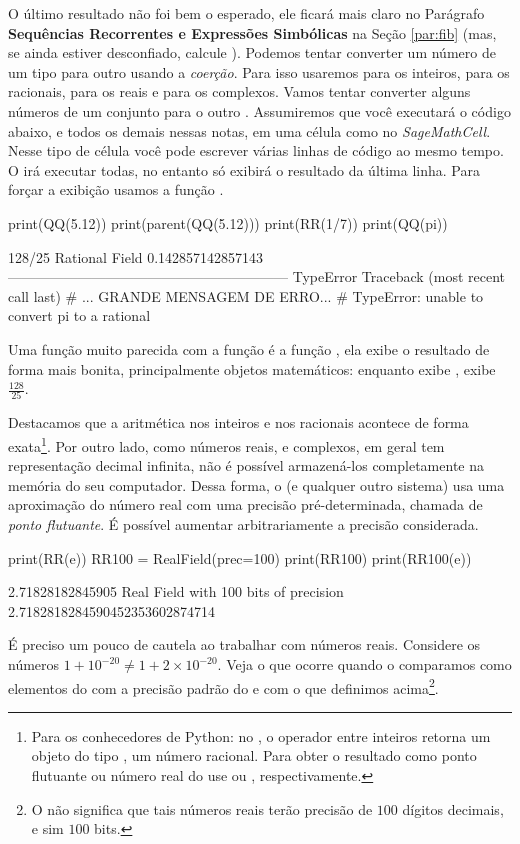 O último resultado não foi bem o esperado, ele ficará
mais claro no Parágrafo \textbf{Sequências Recorrentes
e Expressões Simbólicas} na Seção \ref{par:fib} (mas, se ainda
estiver desconfiado, calcule ). Podemos 
tentar converter um número de um tipo para outro usando
a \emph{coerção}. Para isso usaremos  para os inteiros,  para
os racionais,  para os reais e  para os complexos. 
Vamos tentar converter alguns números de um conjunto para o outro
. Assumiremos que você executará o código abaixo, e todos os demais nessas notas,
em uma célula como no \emph{SageMathCell}. Nesse tipo de célula você
pode escrever várias linhas de código ao mesmo tempo. O \sage
irá executar todas, no entanto só exibirá o resultado
da última linha. Para forçar a exibição usamos a função .
\begin{sageinput}
print(QQ(5.12))
print(parent(QQ(5.12)))
print(RR(1/7))
print(QQ(pi))
\end{sageinput}
\begin{sageoutput}
128/25
Rational Field
0.142857142857143
------------------------------------------------------------
TypeError                  Traceback (most recent call last)
# ...  GRANDE MENSAGEM DE ERRO... #
TypeError: unable to convert pi to a rational
\end{sageoutput}

Uma função muito parecida com a função 
é a função , ela exibe o resultado
de forma mais bonita, principalmente objetos matemáticos:
enquanto  exibe ,
 exibe $\frac{128}{25}$.

Destacamos que a aritmética nos inteiros e nos racionais
acontece de forma exata\footnote{Para os conhecedores
de Python: no \sage, o operador \ils{/} entre inteiros 
retorna um objeto  do tipo , um número
racional. Para obter o resultado como ponto flutuante
ou número real do \sage use   ou 
, respectivamente.}.
 Por outro lado, como números
reais, e complexos, em geral tem representação decimal 
infinita, não é possível armazená-los completamente na
memória do seu computador. Dessa forma, o \sage (e qualquer
outro sistema) usa uma aproximação do número
real com uma precisão pré-determinada, chamada
de \emph{ponto flutuante}.
É possível aumentar
arbitrariamente a precisão considerada.
\begin{sageinput}
print(RR(e))
RR100 = RealField(prec=100)
print(RR100)
print(RR100(e))
\end{sageinput}
\begin{sageoutput}
2.71828182845905
Real Field with 100 bits of precision
2.7182818284590452353602874714
\end{sageoutput}
É preciso um pouco de cautela ao trabalhar com números reais.
Considere os números $1+10^{-20} \neq 1+2\times 10^{-20}$. 
Veja o que ocorre quando o comparamos como elementos
do  com a precisão padrão do \sage e com o 
 que definimos acima\footnote{O
 não significa que tais números
reais terão precisão de $100$ dígitos decimais, e sim
$100$ bits.}.

